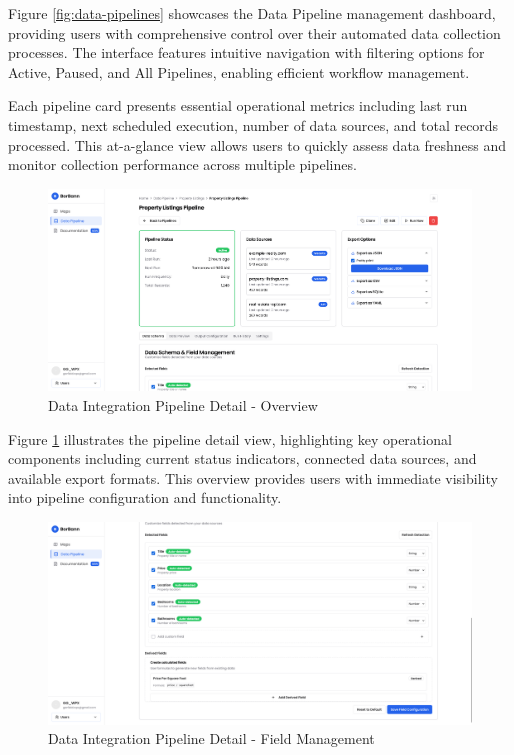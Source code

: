 Figure \ref{fig:data-pipelines} showcases the Data Pipeline management dashboard, providing users with comprehensive control over their automated data collection processes. The interface features intuitive navigation with filtering options for Active, Paused, and All Pipelines, enabling efficient workflow management.

Each pipeline card presents essential operational metrics including last run timestamp, next scheduled execution, number of data sources, and total records processed. This at-a-glance view allows users to quickly assess data freshness and monitor collection performance across multiple pipelines.

\begin{figure}[h]
\centering
\includegraphics[width=1\textwidth]{assets/ui/data-pipelines-detailed-1.png}
\caption{Data Integration Pipeline Detail - Overview}
\label{fig:data-pipelines-detailed-1}
\end{figure}

Figure \ref{fig:data-pipelines-detailed-1} illustrates the pipeline detail view, highlighting key operational components including current status indicators, connected data sources, and available export formats. This overview provides users with immediate visibility into pipeline configuration and functionality.

\begin{figure}[h]
\centering
\includegraphics[width=1\textwidth]{assets/ui/data-pipelines-detailed-2.png}
\caption{Data Integration Pipeline Detail - Field Management}
\label{fig:data-pipelines-detailed-2}
\end{figure}

